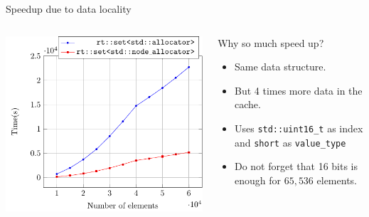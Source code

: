 \documentclass[10pt,aspectratio=169]{beamer}
\begin{document}
\begin{frame}
{Speedup due to data locality}
\begin{columns}

    \begin{column}{0.47\textwidth}
        \begin{center}
            \includegraphics[scale=0.7]{fig/rtset_bench.pdf} \\
        \end{center}
    \end{column}

    \begin{column}{0.47\textwidth}
         \begin{block}{Why so much speed up?}
           \begin{itemize}
           \item Same data structure.
           \item But 4 times more data in the cache.
           \item Uses \texttt{std::uint16\_t} as index
           and \texttt{short} as \texttt{value\_type}
           \item {\color{alertc} Do not forget that 16 bits is
           enough for $65,536$ elements.}
           \end{itemize}
         \end{block}
    \end{column}

\end{columns}
\end{frame}
\end{document}
